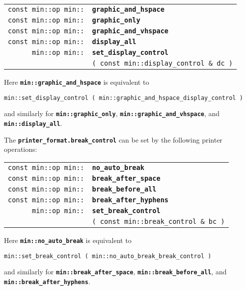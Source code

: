 \documentclass[12pt]{article}
\makeatletter
\newcommand{\TT}[1]{{\tt \bfseries #1}}
\newcommand{\ttindex}[1]{\index{#1@{\tt #1}}}
\newcommand{\EOL}{\penalty \exhyphenpenalty}
\newenvironment{indpar}[1][0.3in]%
	{\begin{list}{}%
		     {\setlength{\itemsep}{0in}%
		      \setlength{\topsep}{0in}%
		      \setlength{\parsep}{1ex}%
		      \setlength{\labelwidth}{#1}%
		      \setlength{\leftmargin}{#1}%
		      \addtolength{\leftmargin}{\labelsep}}%
	 \item}%
	{\end{list}}
\newcommand{\LABEL}[1]{\label{#1}}
\newlength{\ARGBREAKLENGTH}
\newcommand{\ARGBREAK}[1][\ARGBREAKLENGTH]{\\&\hspace*{#1}}
\newcommand{\MINKEY}[1]%
	   {\TT{#1}\ttindex{min::#1}\ttindex{#1}}
\makeatother
\begin{document}
\begin{indpar}[1em]\begin{tabular}{r@{}l}
\verb|const min::op min::| & \MINKEY{graphic\_and\_hspace}
\LABEL{MIN::GRAPHIC_AND_HSPACE} \\
\verb|const min::op min::| & \MINKEY{graphic\_only}
\LABEL{MIN::GRAPHIC_ONLY} \\
\verb|const min::op min::| & \MINKEY{graphic\_and\_vhspace}
\LABEL{MIN::GRAPHIC_AND_VHSPACE} \\
\verb|const min::op min::| & \MINKEY{display\_all}
\LABEL{MIN::DISPLAY_ALL} \\
\verb|min::op min::|
    & \MINKEY{set\_display\_control}\ARGBREAK
          \verb|( const min::display_control & dc )|
\LABEL{MIN::SET_DISPLAY_CONTROL} \\
\end{tabular}\end{indpar}

Here \TT{min::graphic\_and\_hspace} is equivalent to
\begin{center}
\verb|min::set_display_control ( min::graphic_and_hspace_display_control )|
\end{center}
and similarly for \TT{min::\EOL graphic\_\EOL only},
\TT{min::\EOL graphic\_\EOL and\_vhspace}, and \TT{min::\EOL display\_\EOL all}.

The \TT{printer\_format.break\_control} can be set by the following
printer operations:

\begin{indpar}[1em]\begin{tabular}{r@{}l}
\verb|const min::op min::| & \MINKEY{no\_auto\_break}
\LABEL{MIN::NO_AUTO_BREAK} \\
\verb|const min::op min::| & \MINKEY{break\_after\_space}
\LABEL{MIN::BREAK_AFTER_SPACE} \\
\verb|const min::op min::| & \MINKEY{break\_before\_all}
\LABEL{MIN::BREAK_BEFORE_ALL} \\
\verb|const min::op min::| & \MINKEY{break\_after\_hyphens}
\LABEL{MIN::BREAK_AFTER_HYPHENS} \\
\verb|min::op min::|
    & \MINKEY{set\_break\_control}\ARGBREAK
          \verb|( const min::break_control & bc )|
\LABEL{MIN::SET_BREAK_CONTROL} \\
\end{tabular}\end{indpar}

Here \TT{min::no\_auto\_break} is equivalent to
\begin{center}
\verb|min::set_break_control ( min::no_auto_break_break_control )|
\end{center}
and similarly for \TT{min::break\_\EOL after\_\EOL space},
\TT{min::break\_\EOL before\_\EOL all},
and \TT{min::break\_\EOL after\_\EOL hyphens}.
\end{document}
